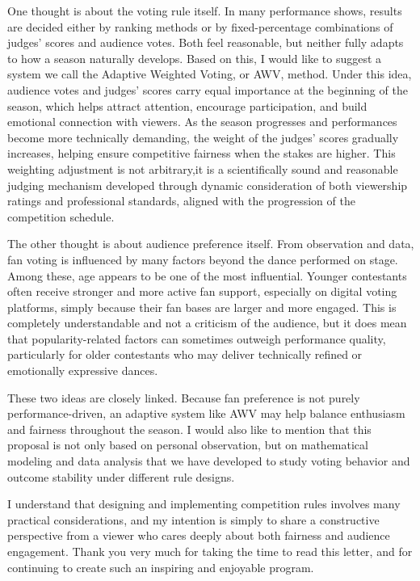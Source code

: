 \documentclass{mcmthesis}
\begin{document}
One thought is about the voting rule itself. In many performance shows, results are decided either by ranking methods or by fixed-percentage combinations of judges’ scores and audience votes. Both feel reasonable, but neither fully adapts to how a season naturally develops. Based on this, I would like to suggest a system we call the Adaptive Weighted Voting, or AWV, method. Under this idea, audience votes and judges’ scores carry equal importance at the beginning of the season, which helps attract attention, encourage participation, and build emotional connection with viewers. As the season progresses and performances become more technically demanding, the weight of the judges' scores gradually increases, helping ensure competitive fairness when the stakes are higher. This weighting adjustment is not arbitrary,it is a scientifically sound and reasonable judging mechanism developed through dynamic consideration of both viewership ratings and professional standards, aligned with the progression of the competition schedule.

The other thought is about audience preference itself. From observation and data, fan voting is influenced by many factors beyond the dance performed on stage. Among these, age appears to be one of the most influential. Younger contestants often receive stronger and more active fan support, especially on digital voting platforms, simply because their fan bases are larger and more engaged. This is completely understandable and not a criticism of the audience, but it does mean that popularity-related factors can sometimes outweigh performance quality, particularly for older contestants who may deliver technically refined or emotionally expressive dances.

These two ideas are closely linked. Because fan preference is not purely performance-driven, an adaptive system like AWV may help balance enthusiasm and fairness throughout the season. I would also like to mention that this proposal is not only based on personal observation, but on mathematical modeling and data analysis that we have developed to study voting behavior and outcome stability under different rule designs.

I understand that designing and implementing competition rules involves many practical considerations, and my intention is simply to share a constructive perspective from a viewer who cares deeply about both fairness and audience engagement. Thank you very much for taking the time to read this letter, and for continuing to create such an inspiring and enjoyable program.
\end{document}
